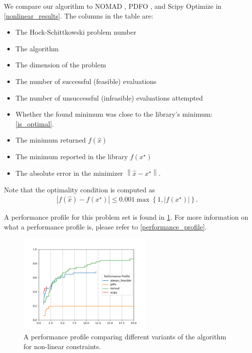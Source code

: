 
We compare our algorithm to NOMAD \cite{AMAIOUA201813}, PDFO \cite{PDFO}, and Scipy Optimize
in \cref{nonlinear_results}.
The columns in the table are:
\begin{itemize}
\item The Hock-Schittkowski problem number
\item The algorithm
\item The dimension of the problem
\item The number of successful (feasible) evaluations
\item The number of unsuccessful (infeasible) evaluations attempted
\item Whether the found minimum was close to the library's minimum: \cref{is_optimal}.
\item The minimum returned $f(\hat x)$
\item The minimum reported in the library $f(x^{\star})$
\item The absolute error in the minimizer $\left\|\hat x - x^{\star}\right\|$.
\end{itemize}
Note that the optimality condition is computed as
\begin{align}
\left|f\left(\hat x\right) - f\left(x^{\star}\right)\right| \le 0.001 \max\left\{1, \left|f\left(x^{\star}\right)\right|\right\}. \label{is_optimal}
\end{align}

A performance profile for this problem set is found in \cref{nonlinear_performance_profile_image}.
For more information on what a performance profile is, please refer to \cref{performance_profile}.

\begin{figure}[ht]
    \centering
    \includegraphics[width=250px]{images/nonlinear_performance_profile.png}
    \caption[A performance profile comparing variants of the algorithm for non-linear constraints.]{
    	A performance profile comparing different variants of the algorithm for non-linear constraints.
    }
    \label{nonlinear_performance_profile_image}
\end{figure}


